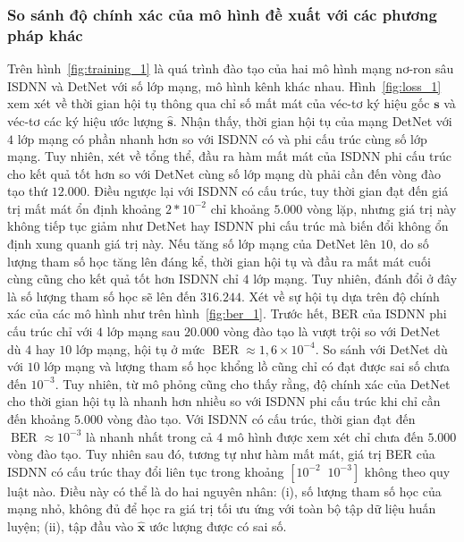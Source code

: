 \subsubsection{So sánh độ chính xác của mô hình đề xuất với các phương pháp khác}
Trên hình~\ref{fig:training_1} là quá trình đào tạo của hai mô hình mạng nơ-ron sâu ISDNN và DetNet với số lớp mạng, mô hình kênh khác nhau. Hình~\ref{fig:loss_1} xem xét về thời gian hội tụ thông qua chỉ số mất mát của véc-tơ ký hiệu gốc $\mathbf{s}$ và véc-tơ các ký hiệu ước lượng $\mathbf{\hat{s}}$. Nhận thấy, thời gian hội tụ của mạng DetNet với $4$ lớp mạng có phần nhanh hơn so với ISDNN có và phi cấu trúc cùng số lớp mạng. Tuy nhiên, xét về tổng thể, đầu ra hàm mất mát của ISDNN phi cấu trúc cho kết quả tốt hơn so với DetNet cùng số lớp mạng dù phải cần đến vòng đào tạo thứ $12.000$. Điều ngược lại với ISDNN có cấu trúc, tuy thời gian đạt đến giá trị mất mát ổn định khoảng $2*10^{-2}$ chỉ khoảng $5.000$ vòng lặp, nhưng giá trị này không tiếp tục giảm như DetNet hay ISDNN phi cấu trúc mà biến đổi không ổn định xung quanh giá trị này. Nếu tăng số lớp mạng của DetNet lên $10$, do số lượng tham số học tăng lên đáng kể, thời gian hội tụ và đầu ra mất mát cuối cùng cũng cho kết quả tốt hơn ISDNN chỉ $4$ lớp mạng. Tuy nhiên, đánh đổi ở đây là số lượng tham số học sẽ lên đến $316.244$. Xét về sự hội tụ dựa trên độ chính xác của các mô hình như trên hình~\ref{fig:ber_1}. Trước hết, BER của ISDNN phi cấu trúc chỉ với $4$ lớp mạng sau $20.000$ vòng đào tạo là vượt trội so với DetNet dù $4$ hay $10$ lớp mạng, hội tụ ở mức $\operatorname{BER}\approx 1,6 \times 10^{-4}$. So sánh với DetNet dù với $10$ lớp mạng và lượng tham số học khổng lồ cũng chỉ có đạt được sai số chưa đến $10^{-3}$. Tuy nhiên, từ mô phỏng cũng cho thấy rằng, độ chính xác của DetNet cho thời gian hội tụ là nhanh hơn nhiều so với ISDNN phi cấu trúc khi chỉ cần đến khoảng $5.000$ vòng đào tạo. Với ISDNN có cấu trúc, thời gian đạt đến $\operatorname{BER}\approx 10^{-3}$ là nhanh nhất trong cả $4$ mô hình được xem xét chỉ chưa đến $5.000$ vòng đào tạo. Tuy nhiên sau đó, tương tự như hàm mất mát, giá trị BER của ISDNN có cấu trúc thay đổi liên tục trong khoảng $[10^{-2} \;\; 10^{-3}]$ không theo quy luật nào. Điều này có thể là do hai nguyên nhân: (i), số lượng tham số học của mạng nhỏ, không đủ để học ra giá trị tối ưu ứng với toàn bộ tập dữ liệu huấn luyện; (ii), tập đầu vào $\hat{\mathbf{x}}$ ước lượng được có sai số.

